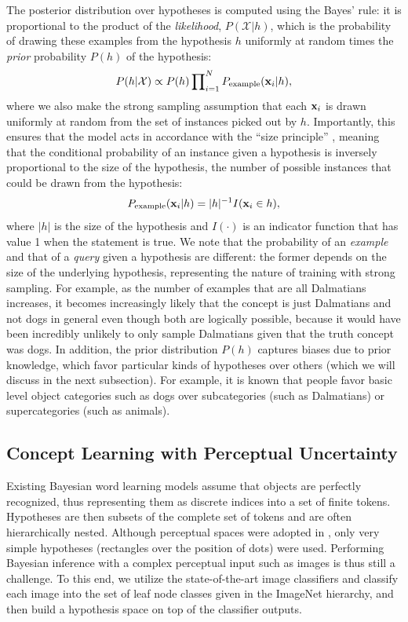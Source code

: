 The posterior distribution over hypotheses is computed using the Bayes' rule: it is proportional to the product of the {\em likelihood}, $P(\mathcal{X} | h)$, which is the probability of drawing these examples from the hypothesis $h$ uniformly at random times the {\em prior} probability $P(h)$ of the hypothesis:
\begin{equation}
    P(h|\mathcal{X}) \propto P(h)\prod\nolimits_{i=1}^{N}P_{\mathrm{example}}(\mathbf{x}_i | h),
\end{equation}
where we also make the strong sampling assumption that each $\mathbf{x}_i$ is drawn uniformly at random from the set of instances picked out by $h$. Importantly, this ensures that the model acts in accordance with the ``size principle'' \cite{tenenbaum99,tenenbaum2001generalization}, meaning that the conditional probability of an instance given a hypothesis is inversely proportional to the size of the hypothesis, \ie the number of possible instances that could be drawn from the hypothesis:
\begin{equation}
    P_{\mathrm{example}}(\mathbf{x}_i | h) = |h|^{-1}I(\mathbf{x}_i \in h),
\end{equation}
where $|h|$ is the size of the hypothesis and $I(\cdot)$ is an indicator function that has value 1 when the statement is true. We note that the probability of an \emph{example} and that of a \emph{query} given a hypothesis are different: the former depends on the size of the underlying hypothesis, representing the nature of training with strong sampling. For example, as the number of examples that are all Dalmatians increases, it becomes increasingly likely that the concept is just Dalmatians and not dogs in general even though both are logically possible, because it would have been incredibly unlikely to only sample Dalmatians given that the truth concept was dogs. In addition, the prior distribution $P(h)$ captures biases due to prior knowledge, which favor particular kinds of hypotheses over others (which we will discuss in the next subsection). For example, it is known that people favor basic level object categories such as dogs over subcategories (such as Dalmatians) or supercategories (such as animals).

\subsection{Concept Learning with Perceptual Uncertainty}
Existing Bayesian word learning models assume that objects are perfectly recognized, thus representing them as discrete indices into a set of finite tokens. Hypotheses are then subsets of the complete set of tokens and are often hierarchically nested. Although perceptual spaces were adopted in \cite{tenenbaum99}, only very simple hypotheses (rectangles over the position of dots) were used. Performing Bayesian inference with a complex perceptual input such as images is thus still a challenge. To this end, we utilize the state-of-the-art image classifiers and classify each image into the set of leaf node classes given in the ImageNet hierarchy, and then build a hypothesis space on top of the classifier outputs.

